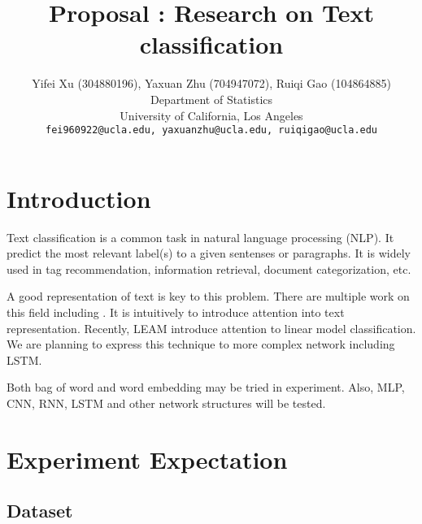 \documentclass{article}
\title{Proposal : Research on Text classification}
\author{
  Yifei Xu (304880196), Yaxuan Zhu (704947072), Ruiqi Gao (104864885) \\
  Department of Statistics \\
  University of California, Los Angeles \\
  \texttt{fei960922@ucla.edu, yaxuanzhu@ucla.edu, ruiqigao@ucla.edu} \\
}
\begin{document}
\maketitle

\section{Introduction}

Text classification is a common task in natural language processing (NLP). It predict the most relevant label(s) to a given sentenses or paragraphs. It is widely used in tag recommendation, information retrieval, document categorization, etc. 

A good representation of text is key to this problem. There are multiple work on this field including \cite{you2018attentionxml} \cite{jiao2019probabilistic} \cite{bahuleyan2017variational} \cite{deng2018latent}. It is intuitively to introduce attention into text representation. Recently, LEAM \cite{wang2018joint} introduce attention to linear model classification. We are planning to express this technique to more complex network including LSTM. 

Both bag of word and word embedding may be tried in experiment. Also, MLP, CNN, RNN, LSTM and other network structures will be tested.












  



\section{Experiment Expectation}

\subsection{Dataset}
\end{document}
